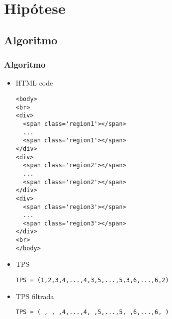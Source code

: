 \documentclass{beamer}
\begin{document}
\section{Hipótese} 
\subsection{Algoritmo}


\begin{frame}[fragile]
\frametitle{Algoritmo}
\fontsize{8}{7.2}\selectfont
\begin{itemize}
\item{HTML code} 
\begin{verbatim}
<body>
<br>
<div>
  <span class='region1'></span>
  ...
  <span class='region1'></span>
</div> 
<div>
  <span class='region2'></span>
  ...
  <span class='region2'></span>
</div>
<div>
  <span class='region3'></span>
  ...
  <span class='region3'></span>
</div>
<br>
</body>
\end{verbatim}
\item{TPS}
\begin{verbatim}
TPS = (1,2,3,4,...,4,3,5,...,5,3,6,...,6,2)
\end{verbatim}
\item{TPS filtrada}
\begin{verbatim}
TPS = ( , , ,4,...,4, ,5,...,5, ,6,...,6, )
\end{verbatim}
\end{itemize}
\end{frame}
\end{document}
